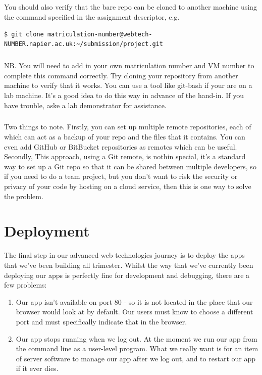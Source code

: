 \documentclass[12pt, a4paper, oneside]{book}
\begin{document}
\paragraph{} You should also verify that the bare repo can be cloned to another machine using the command specified in the assignment descriptor, e.g.

\begin{lstlisting}[style=DOS]
    $ git clone matriculation-number@webtech-NUMBER.napier.ac.uk:~/submission/project.git
\end{lstlisting}

\paragraph{} NB. You will need to add in your own matriculation number and VM number to complete this command correctly. Try cloning your repository from another machine to verify that it works. You can use a tool like git-bash if your are on a lab machine. It's a good idea to do this way in advance of the hand-in. If you have trouble, aske a lab demonstrator for assistance.

\paragraph{} Two things to note. Firstly, you can set up multiple remote repositories, each of which can act as a backup of your repo and the files that it contains. You can even add GitHub or BitBucket repositories as remotes which can be useful. Secondly, This approach, using a Git remote, is nothin special, it's a standard way to set up a Git repo so that it can be shared between multiple developers, so if you need to do a team project, but you don't want to risk the security or privacy of your code by hosting on a cloud service, then this is one way to solve the problem.


\chapter{Deployment}
\label{deployment}

The final step in our advanced web technologies journey is to deploy the apps that we've been building all trimester. Whilst the way that we've currently been deploying our apps is perfectly fine for development and debugging, there are a few problems:

\begin{enumerate}
\item Our app isn't available on port 80 - so it is not located in the place that our browser would look at by default. Our users must know to choose a different port and must specifically indicate that in the browser.
\item Our app stops running when we log out. At the moment we run our app from the command line as a user-level program. What we really want is for an item of server software to manage our app after we log out, and to restart our app if it ever dies.
\end{enumerate}
\end{document}

